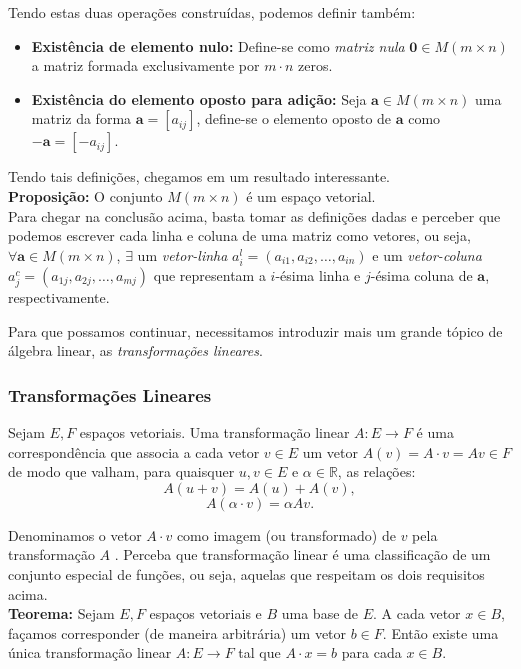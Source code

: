 \documentclass[a4paper,12pt]{article}
\begin{document}
	Tendo estas duas operações construídas, podemos definir também:
	\begin{itemize}
		\item \textbf{Existência de elemento nulo:} Define-se como \textit{matriz nula} $\mathbf{0} \in M(m \times n)$ a matriz formada exclusivamente por $m\cdot n$ zeros.
		
		\item \textbf{Existência do elemento oposto para adição:} Seja $\mathbf{a} \in M(m \times n)$ uma matriz da forma $\mathbf{a} = [a_{ij}]$, define-se o elemento oposto de $\mathbf{a}$ como $-\mathbf{a} = [-a_{ij}].$
	\end{itemize}

	Tendo tais definições, chegamos em um resultado interessante.
	\\
	
	\textbf{Proposição: }O conjunto $M(m \times n)$ é um espaço vetorial. \cite{AlgebraLinearElon}
	\\ \newline	Para chegar na conclusão acima, basta tomar as definições dadas e perceber que podemos escrever cada linha e coluna de uma matriz como vetores, ou seja, $\forall \mathbf{a} \in M(m \times n)$, $\exists$ um \textit{vetor-linha} $a_i^l = (a_{i1}, a_{i2}, \dots, a_{in})$ e um \textit{vetor-coluna} $a_j^c = (a_{1j}, a_{2j}, \dots, a_{mj})$ que representam a $i$-ésima linha e $j$-ésima coluna de $\mathbf{a}$, respectivamente.
	
	Para que possamos continuar, necessitamos introduzir mais um grande tópico de álgebra linear, as \textit{transformações lineares}.
	\subsubsection*{Transformações Lineares}
	Sejam $E, F$ espaços vetoriais. Uma transformação linear $A: E \longrightarrow F$ é uma correspondência que associa a cada vetor $v \in E$ um vetor $A(v) = A\cdot v = Av \in F$ de modo que valham, para quaisquer $u,v \in E$ e $\alpha \in \mathbb{R}$, as relações:  
	$$A(u + v) = A(u) + A(v),$$
	$$A(\alpha\cdot v) = \alpha Av.$$ 
	
	Denominamos o vetor $A\cdot v$ como imagem (ou transformado) de $v$ pela transformação $A$ \cite{AlgebraLinearElon}. Perceba que transformação linear é uma classificação de um conjunto especial de funções, ou seja, aquelas que respeitam os dois requisitos acima.
	\\ \newline \textbf{Teorema:} Sejam $E, F$ espaços vetoriais e $B$ uma base de $E$. A cada vetor $x \in B$, façamos corresponder (de maneira arbitrária) um vetor $b \in F$. Então existe uma única transformação linear $A: E\longrightarrow F$ tal que $A\cdot x = b$ para cada $x \in B$.
	
\end{document}
